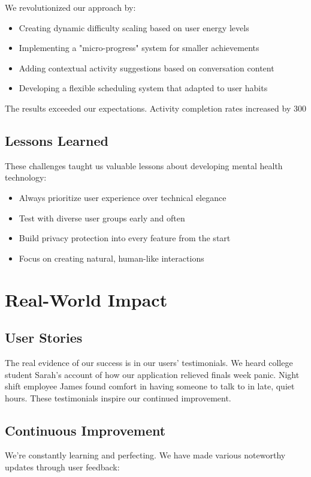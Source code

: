 \documentclass[12pt]{article}
\begin{document}
We revolutionized our approach by:
\begin{itemize}
    \item Creating dynamic difficulty scaling based on user energy levels
    \item Implementing a "micro-progress" system for smaller achievements
    \item Adding contextual activity suggestions based on conversation content
    \item Developing a flexible scheduling system that adapted to user habits
\end{itemize}

The results exceeded our expectations. Activity completion rates increased by 300%

\subsection{Lessons Learned}
These challenges taught us valuable lessons about developing mental health technology:
\begin{itemize}
    \item Always prioritize user experience over technical elegance
    \item Test with diverse user groups early and often
    \item Build privacy protection into every feature from the start
    \item Focus on creating natural, human-like interactions
\end{itemize}

\section{Real-World Impact}

\subsection{User Stories}
The real evidence of our success is in our users' testimonials. We heard college student Sarah's account of how our application relieved finals week panic. Night shift employee James found comfort in having someone to talk to in late, quiet hours. These testimonials inspire our continued improvement.

\subsection{Continuous Improvement}
We're constantly learning and perfecting. We have made various noteworthy updates through user feedback:
\end{document}
